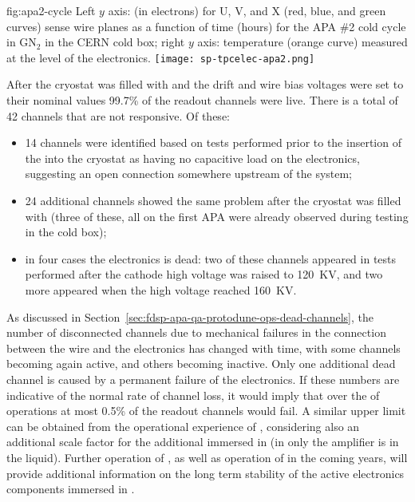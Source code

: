 \begin{dunefigure}
{fig:apa2-cycle}
{Left $y$ axis:  (in electrons) for U, V, and X (red, blue, and green 
curves) sense wire planes as a function of time (hours) for the APA \#2 cold 
cycle in GN$_2$ in the CERN cold box; right $y$ axis: temperature 
(orange curve) measured at the level of the  electronics.}
\texttt{[image: sp-tpcelec-apa2.png]}
\end{dunefigure}
After the cryostat was filled with  and the drift and wire 
bias voltages were set to their nominal values
99.7\% of the  readout channels were live.
There is a total of 42 channels that are not responsive. Of these:
\begin{itemize}
\item{14 channels were identified based on tests performed prior
to the insertion of the  into the cryostat as having
no capacitive load on the  electronics, suggesting an open 
connection somewhere upstream  of the  system;}
\item{24 additional channels showed the same problem after the
cryostat was filled with  (three of these, all on the
first APA were already observed during testing in the cold box);}
\item{in four cases the  electronics is dead: two of these
channels appeared in tests performed after the cathode high
voltage was raised to \SI{120}{KV}, and two more
appeared when the high voltage reached \SI{160}{KV}.}
\end{itemize}

As discussed in Section~\ref{sec:fdsp-apa-qa-protodune-ops-dead-channels},
the number of disconnected channels %
due to mechanical failures in the connection between
the  wire and the  electronics has
changed with time, with some channels becoming again active,
and others becoming inactive. Only one additional dead channel
is caused by a permanent failure of the  electronics.
If these numbers are indicative
of the normal rate of channel loss, it would imply that
over the \dunelifetime of  operations at
most \num{0.5}\% of the readout channels would fail. A
similar upper limit can be obtained from the operational
experience of , considering also an
additional scale factor for the additional 
immersed in  (in  only
the  amplifier is in the liquid). Further 
operation of , as well as operation of
 in the coming years, will provide additional
information on the long term stability of the active electronics
components immersed in .

